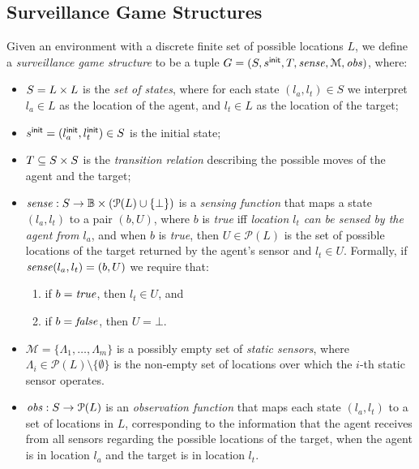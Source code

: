 \subsection{Surveillance Game Structures}\label{sec:surveillance-games}
Given an environment with a discrete finite set of possible locations $L$, we define a \emph{surveillance game structure} to be  a tuple $G  = (S,s^{\mathsf{init}},T,\mathit{sense},\mathcal{M},\mathit{obs})$, where:
\begin{itemize}
\item $S = L \times L$ is the \emph{set of states}, where for each state $(l_a,l_t) \in S$ we interpret $l_a \in L$ as the location of the agent, and $l_t \in L$ as the location of the target;
\item $s^{\mathsf{init}} = (l_a^{\mathsf{init}},l_t^{\mathsf{init}}) \in S$ is the initial state;
\item $T \subseteq S \times S$ is the \emph{transition relation} describing the possible moves of the agent and the target; 
\item $\mathit{sense} : S \to \mathbb{B} \times (\mathcal{P}(L)\cup \{\bot\})$ is a \emph{sensing function} that maps a state $(l_a,l_t)$ to a pair $(b,U)$, where $b$ is \emph{true} iff \emph{location $l_t$ can be sensed by the agent from $l_a$}, and when $b$ is \emph{true}, then $U \in \mathcal{P}(L)$ is the set of possible locations of the target returned by the agent's sensor and $l_t \in U$. Formally, if $\mathit{sense}(l_a,l_t) = (b,U)$ we require that:
\begin{enumerate}
    \item if $b = \mathit{true}$, then $l_t \in U$, and
    \item if $b = \mathit{false}$, then $U = \bot$.
\end{enumerate}
\item $\mathcal{M} = \{\Lambda_1,\dots,\Lambda_m\}$ is a possibly empty set of \emph{static sensors}, where $\Lambda_i \in \mathcal{P}(L) \setminus \{\emptyset\}$ is the non-empty set of locations over which the $i$-th static sensor operates.
\item $\mathit{obs} : S \to \mathcal{P}(L)$ is an \emph{observation function} that maps each state $(l_a,l_t)$ to a set of locations in $L$, corresponding to the information that the agent receives from all sensors regarding the possible locations of the target, when the agent is in location $l_a$ and the target is in location $l_t$.
\end{itemize}

